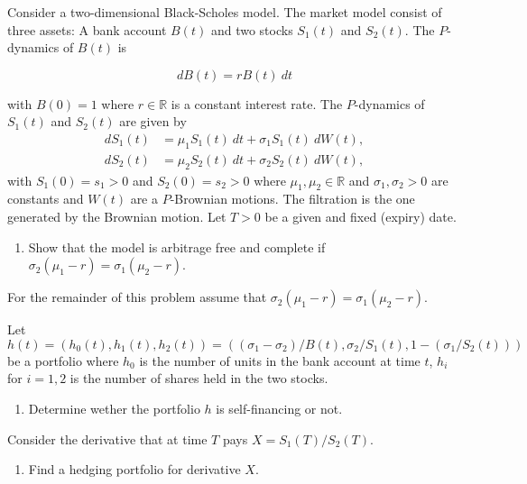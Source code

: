 \documentclass[a4paper,12pt,openany]{book}
\providecommand{\tightlist}{%
 \setlength{\itemsep}{0pt}\setlength{\parskip}{0pt}}
\begin{document}
Consider a two-dimensional Black-Scholes model. The market model consist of three assets: A bank account \(B(t)\) and two stocks \(S_1(t)\) and \(S_2(t)\). The \(P\)-dynamics of \(B(t)\) is

\[
dB(t)=rB(t)\ dt
\]

with \(B(0)=1\) where \(r\in\mathbb{R}\) is a constant interest rate. The \(P\)-dynamics of \(S_1(t)\) and \(S_2(t)\) are given by
\begin{align*}
dS_1(t)&=\mu_1S_1(t)\ dt+\sigma_1 S_1(t)\ dW(t),\\
dS_2(t)&=\mu_2S_2(t)\ dt+\sigma_2 S_2(t)\ dW(t),
\end{align*}
with \(S_1(0)=s_1>0\) and \(S_2(0)=s_2>0\) where \(\mu_1,\mu_2\in\mathbb{R}\) and \(\sigma_1,\sigma_2>0\) are constants and \(W(t)\) are a \(P\)-Brownian motions. The filtration is the one generated by the Brownian motion. Let \(T>0\) be a given and fixed (expiry) date.

\begin{enumerate}
\def\labelenumi{\alph{enumi}.}
\tightlist
\item
  Show that the model is arbitrage free and complete if \(\sigma_2(\mu_1-r)=\sigma_1(\mu_2-r)\).
\end{enumerate}

For the remainder of this problem assume that \(\sigma_2(\mu_1-r)=\sigma_1(\mu_2-r)\).

Let \(h(t)=(h_0(t),h_1(t),h_2(t))=((\sigma_1-\sigma_2)/B(t),\sigma_2/S_1(t),1-(\sigma_1/S_2(t)))\) be a portfolio where \(h_0\) is the number of units in the bank account at time \(t\), \(h_i\) for \(i=1,2\) is the number of shares held in the two stocks.

\begin{enumerate}
\def\labelenumi{\alph{enumi}.}
\setcounter{enumi}{1}
\tightlist
\item
  Determine wether the portfolio \(h\) is self-financing or not.
\end{enumerate}

Consider the derivative that at time \(T\) pays \(X=S_1(T)/S_2(T)\).

\begin{enumerate}
\def\labelenumi{\alph{enumi}.}
\setcounter{enumi}{2}
\tightlist
\item
  Find a hedging portfolio for derivative \(X\).
\end{enumerate}

\noindent\makebox[\linewidth]{\rule{\textwidth}{0.4pt}}
\end{document}
